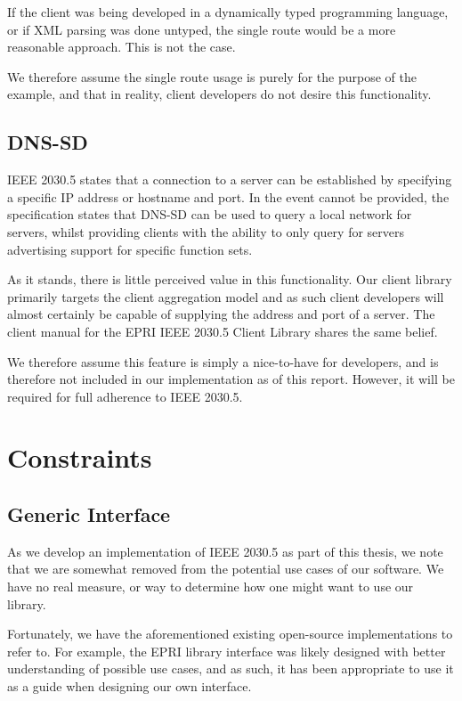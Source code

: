 If the client was being developed in a dynamically typed programming language, or if XML parsing was done untyped, the single route would be a more reasonable approach. This is not the case.

We therefore assume the single route usage is purely for the purpose of the example, and that in reality, client developers do not desire this functionality.

\subsection{DNS-SD}
IEEE 2030.5 states that a connection to a server can be established by specifying a specific IP address or hostname and port. In the event cannot be provided, the specification states that DNS-SD can be used to query a local network for servers, whilst providing clients with the ability to only query for servers advertising support for specific function sets. 

As it stands, there is little perceived value in this functionality. Our client library primarily targets the client aggregation model and as such client developers will almost certainly be capable of supplying the address and port of a server.
The client manual for the EPRI IEEE 2030.5 Client Library shares the same belief. \cite{eprimanual}

We therefore assume this feature is simply a nice-to-have for developers, and is therefore not included in our implementation as of this report. However, it will be required for full adherence to IEEE 2030.5.

\section{Constraints}

\subsection{Generic Interface}
As we develop an implementation of IEEE 2030.5 as part of this thesis, we note that we are somewhat removed from the potential use cases of our software. We have no real measure, or way to determine how one might want to use our library. 

Fortunately, we have the aforementioned existing open-source implementations to refer to. For example, the EPRI library interface was likely designed with better understanding of possible use cases, and as such, it has been appropriate to use it as a guide when designing our own interface.

